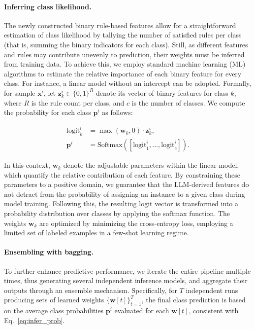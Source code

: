 \vspace*{-0.12in}
\paragraph{Inferring class likelihood.} The newly constructed binary rule-based features allow for a straightforward estimation of class likelihood by tallying the number of satisfied rules per class (that is, summing the binary indicators for each class). Still, as different features and rules may contribute unevenly to prediction, their weights must be inferred from training data. To achieve this, we employ standard machine learning (ML) algorithms to estimate the relative importance of each binary feature for every class. For instance, a linear model without an intercept can be adopted. Formally, for sample $\mathbf{x}^i$, let $\mathbf{z}_k^i \in \{0, 1\}^R$ denote its vector of binary features for class $k$, where $R$ is the rule count per class, and $c$ is the number of classes. We compute the probability for each class $\mathbf{p}^i$ as follows:

\begin{align}
\text{logit}_k^i &= \max(\mathbf{w}_k, 0) \cdot \mathbf{z}_k^i, \nonumber \\
\mathbf{p}^i &= \text{Softmax}({[\text{logit}_{1}^i, ..., \text{logit}_{c}^i]}). \label{eq:infer_prob}
\end{align}

In this context, $\mathbf{w}_k$ denote the adjustable parameters within the linear model, which quantify the relative contribution of each feature. By constraining these parameters to a positive domain, we guarantee that the LLM-derived features do not detract from the probability of assigning an instance to a given class during model training. Following this, the resulting logit vector is transformed into a probability distribution over classes by applying the softmax function. The weights $\mathbf{w}_k$ are optimized by minimizing the cross-entropy loss, employing a limited set of labeled examples in a few-shot learning regime.

\vspace*{-0.12in}
\paragraph{Ensembling with bagging.} To further enhance predictive performance, we iterate the entire pipeline multiple times, thus generating several independent inference models, and aggregate their outputs through an ensemble mechanism. Specifically, for $T$ independent runs producing sets of learned weights $\{\mathbf{w}[t]\}_{t=1}^T$, the final class prediction is based on the average class probabilities $\mathbf{p}^i$ evaluated for each $\mathbf{w}[t]$, consistent with Eq.~\ref{eq:infer_prob}.

